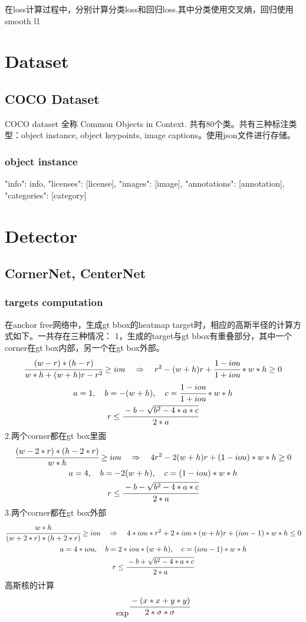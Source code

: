 \documentclass{article}
\begin{document}
在loss计算过程中，分别计算分类loss和回归loss.其中分类使用交叉熵，回归使用smooth l1



\section{Dataset}
\subsection{COCO Dataset}
COCO dataset 全称 Common Objects in Context. 共有80个类。共有三种标注类型：object instance, object keypoints, image captions。使用json文件进行存储。
\subsubsection{object instance}
{
    "info": info,
    "licenses": [license],
    "images": [image],
    "annotations": [annotation],
    "categories": [category]
}

\section{Detector}
\subsection{CornerNet, CenterNet}
\subsubsection{targets computation}
在anchor free网络中，生成gt bbox的heatmap target时，相应的高斯半径的计算方式如下。一共存在三种情况：
1，生成的target与gt bbox有重叠部分，其中一个corner在gt box内部，另一个在gt box外部。
\begin{gather}
        \cfrac{(w-r)*(h-r)}{w*h+(w+h)r-r^2} \ge {iou} \quad\Rightarrow\quad
        {r^2-(w+h)r+\cfrac{1-iou}{1+iou}*w*h} \ge 0 \\
        {a} = 1,\quad{b} = {-(w+h)},\quad{c} = {\cfrac{1-iou}{1+iou}*w*h} \\
        {r} \le \cfrac{-b-\sqrt{b^2-4*a*c}}{2*a}
\end{gather}
2.两个corner都在gt box里面
\begin{gather}
\cfrac{(w-2*r)*(h-2*r)}{w*h} \ge {iou} \quad\Rightarrow\quad
        {4r^2-2(w+h)r+(1-iou)*w*h} \ge 0 \\
        {a} = 4,\quad {b} = {-2(w+h)},\quad {c} = {(1-iou)*w*h} \\
        {r} \le \cfrac{-b-\sqrt{b^2-4*a*c}}{2*a}
\end{gather}
3.两个corner都在gt box外部
\begin{gather}
\cfrac{w*h}{(w+2*r)*(h+2*r)} \ge {iou} \quad\Rightarrow\quad
        {4*iou*r^2+2*iou*(w+h)r+(iou-1)*w*h} \le 0 \\
        {a} = {4*iou},\quad {b} = {2*iou*(w+h)},\quad {c} = {(iou-1)*w*h} \\
        {r} \le \cfrac{-b+\sqrt{b^2-4*a*c}}{2*a}
\end{gather}
高斯核的计算
\begin{align}
\exp^{\cfrac{-(x*x+y*y)}{2*\sigma*\sigma}}
\end{align}
\end{document}
